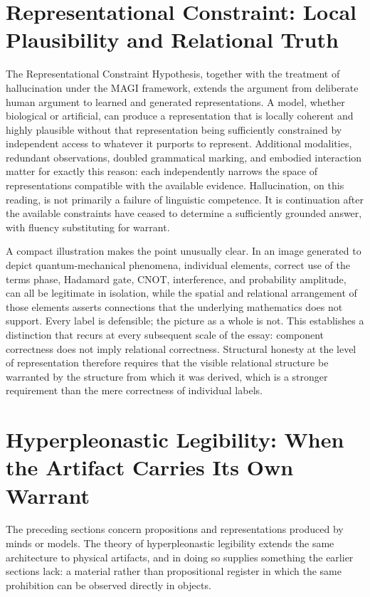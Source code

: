 \documentclass[11pt]{article}
\begin{document}
\section{Representational Constraint: Local Plausibility and Relational Truth}

The Representational Constraint Hypothesis, together with the treatment of hallucination under the MAGI framework, extends the argument from deliberate human argument to learned and generated representations. A model, whether biological or artificial, can produce a representation that is locally coherent and highly plausible without that representation being sufficiently constrained by independent access to whatever it purports to represent. Additional modalities, redundant observations, doubled grammatical marking, and embodied interaction matter for exactly this reason: each independently narrows the space of representations compatible with the available evidence. Hallucination, on this reading, is not primarily a failure of linguistic competence. It is continuation after the available constraints have ceased to determine a sufficiently grounded answer, with fluency substituting for warrant.

A compact illustration makes the point unusually clear. In an image generated to depict quantum-mechanical phenomena, individual elements, correct use of the terms phase, Hadamard gate, CNOT, interference, and probability amplitude, can all be legitimate in isolation, while the spatial and relational arrangement of those elements asserts connections that the underlying mathematics does not support. Every label is defensible; the picture as a whole is not. This establishes a distinction that recurs at every subsequent scale of the essay: component correctness does not imply relational correctness. Structural honesty at the level of representation therefore requires that the visible relational structure be warranted by the structure from which it was derived, which is a stronger requirement than the mere correctness of individual labels.

\section{Hyperpleonastic Legibility: When the Artifact Carries Its Own Warrant}

The preceding sections concern propositions and representations produced by minds or models. The theory of hyperpleonastic legibility extends the same architecture to physical artifacts, and in doing so supplies something the earlier sections lack: a material rather than propositional register in which the same prohibition can be observed directly in objects.
\end{document}
